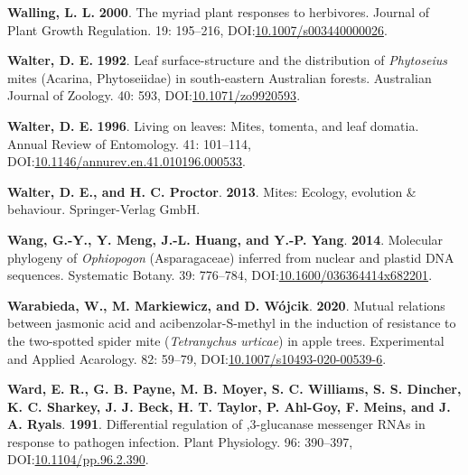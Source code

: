 \documentclass[12pt,final,CPage]{ufthesis}
\newlength{\cslhangindent}
\newenvironment{CSLReferences}[2] %
{%
	\setlength{\parindent}{0pt}
	\ifodd #1 \everypar{\setlength{\hangindent}{\cslhangindent}}\ignorespaces\fi
	\ifnum #2 > 0
	\setlength{\parskip}{#2\baselineskip}
	\fi
}%
{}
\begin{document}
{\begin{CSLReferences}{1}{0}
  \leavevmode{}%
  \textbf{Walling, L. L.} \textbf{2000}. The myriad plant responses to herbivores. Journal of Plant Growth Regulation. 19: 195--216, DOI:\href{https://doi.org/10.1007/s003440000026}{10.1007/s003440000026}.

  \leavevmode{}%
  \textbf{Walter, D. E.} \textbf{1992}. Leaf surface-structure and the distribution of {\emph{Phytoseius}} mites ({Acarina}, {Phytoseiidae}) in south-eastern {Australian} forests. Australian Journal of Zoology. 40: 593, DOI:\href{https://doi.org/10.1071/zo9920593}{10.1071/zo9920593}.

  \leavevmode{}%
  \textbf{Walter, D. E.} \textbf{1996}. Living on leaves: Mites, tomenta, and leaf domatia. Annual Review of Entomology. 41: 101--114, DOI:\href{https://doi.org/10.1146/annurev.en.41.010196.000533}{10.1146/annurev.en.41.010196.000533}.

  \leavevmode{}%
  \textbf{Walter, D. E., and H. C. Proctor}. \textbf{2013}. Mites: Ecology, evolution \& behaviour. Springer-Verlag GmbH.

  \leavevmode{}%
  \textbf{Wang, G.-Y., Y. Meng, J.-L. Huang, and Y.-P. Yang}. \textbf{2014}. Molecular phylogeny of {\emph{Ophiopogon}} {({Asparagaceae})} inferred from nuclear and plastid {DNA} sequences. Systematic Botany. 39: 776--784, DOI:\href{https://doi.org/10.1600/036364414x682201}{10.1600/036364414x682201}.

  \leavevmode{}%
  \textbf{Warabieda, W., M. Markiewicz, and D. Wójcik}. \textbf{2020}. Mutual relations between jasmonic acid and acibenzolar-{S}-methyl in the induction of resistance to the two-spotted spider mite ({\emph{Tetranychus urticae}}) in apple trees. Experimental and Applied Acarology. 82: 59--79, DOI:\href{https://doi.org/10.1007/s10493-020-00539-6}{10.1007/s10493-020-00539-6}.

  \leavevmode{}%
  \textbf{Ward, E. R., G. B. Payne, M. B. Moyer, S. C. Williams, S. S. Dincher, K. C. Sharkey, J. J. Beck, H. T. Taylor, P. Ahl-Goy, F. Meins, and J. A. Ryals}. \textbf{1991}. Differential regulation of ,3-glucanase messenger {RNAs} in response to pathogen infection. Plant Physiology. 96: 390--397, DOI:\href{https://doi.org/10.1104/pp.96.2.390}{10.1104/pp.96.2.390}.


\end{CSLReferences}}
\end{document}
